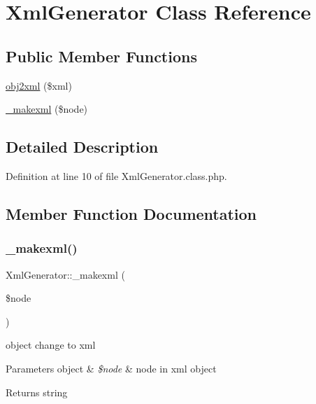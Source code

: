 \hypertarget{classXmlGenerator}{}\section{Xml\+Generator Class Reference}
\label{classXmlGenerator}
\subsection*{Public Member Functions}
\begin{DoxyCompactItemize}
\item 
\hyperlink{classXmlGenerator_ae887d13949d0ec6537feb11f6d9aa00f}{obj2xml} (\$xml)
\item 
\hyperlink{classXmlGenerator_a6cc99afb973e29301b794c22159056fa}{\+\_\+makexml} (\$node)
\end{DoxyCompactItemize}


\subsection{Detailed Description}


Definition at line 10 of file Xml\+Generator.\+class.\+php.



\subsection{Member Function Documentation}
\mbox{\label{classXmlGenerator_a6cc99afb973e29301b794c22159056fa}} 
\subsubsection{\texorpdfstring{\+\_\+makexml()}{\_makexml()}}
{\footnotesize\ttfamily Xml\+Generator\+::\+\_\+makexml (\begin{DoxyParamCaption}\item[{}]{\$node }\end{DoxyParamCaption})}

object change to xml 
\begin{DoxyParams}[1]{Parameters}
object & {\em \$node} & node in xml object \\
\hline
\end{DoxyParams}
\begin{DoxyReturn}{Returns}
string 
\end{DoxyReturn}


